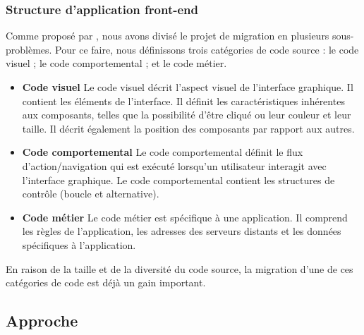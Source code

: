 \documentclass[a4paper]{article}
\begin{document}
\subsubsection{Structure d'application front-end}
\label{sec:guiDecomposition}

Comme proposé par \citet{Haya12a}, nous avons divisé le projet de migration en plusieurs sous-problèmes.
Pour ce faire, nous définissons trois catégories de code source :
  le code visuel ; 
  le code comportemental ; et
  le code métier.

\begin{itemize}

\item \textbf{Code visuel}
Le code visuel décrit l'aspect visuel de l'interface graphique.
Il contient les éléments de l'interface. 
Il définit les caractéristiques inhérentes aux composants, telles que la possibilité d'être cliqué ou leur couleur et leur taille. 
Il décrit également la position des composants par rapport aux autres. 

\item \textbf{Code comportemental}
Le code comportemental définit le flux d'action/navigation qui est exécuté lorsqu'un utilisateur interagit avec l'interface graphique.
Le code comportemental contient les structures de contrôle (boucle et alternative).

\item \textbf{Code métier}
Le code métier est spécifique à une application.
Il comprend les règles de l'application, les adresses des serveurs distants et les données spécifiques à l'application.

\end{itemize}

En raison de la taille et de la diversité du code source, la migration d'une de ces catégories de code est déjà un gain important.

\subsection{Approche}
\label{sec:approche}
\end{document}
